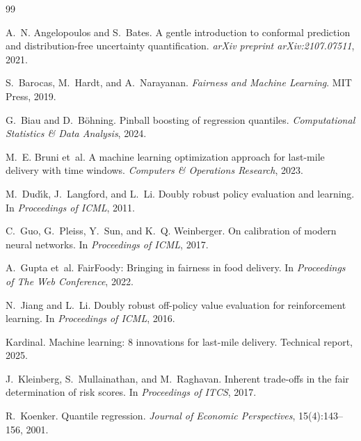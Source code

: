 \documentclass[10pt,twocolumn]{article}
\begin{document}

\begin{thebibliography}{99}

A.~N. Angelopoulos and S.~Bates.
\newblock A gentle introduction to conformal prediction and distribution-free uncertainty quantification.
\newblock \emph{arXiv preprint arXiv:2107.07511}, 2021.

S.~Barocas, M.~Hardt, and A.~Narayanan.
\newblock \emph{Fairness and Machine Learning}.
\newblock MIT Press, 2019.

G.~Biau and D.~B{\"o}hning.
\newblock Pinball boosting of regression quantiles.
\newblock \emph{Computational Statistics \& Data Analysis}, 2024.

M.~E. Bruni et~al.
\newblock A machine learning optimization approach for last-mile delivery with time windows.
\newblock \emph{Computers \& Operations Research}, 2023.

M.~Dud{\'\i}k, J.~Langford, and L.~Li.
\newblock Doubly robust policy evaluation and learning.
\newblock In \emph{Proceedings of ICML}, 2011.

C.~Guo, G.~Pleiss, Y.~Sun, and K.~Q. Weinberger.
\newblock On calibration of modern neural networks.
\newblock In \emph{Proceedings of ICML}, 2017.

A.~Gupta et~al.
\newblock FairFoody: Bringing in fairness in food delivery.
\newblock In \emph{Proceedings of The Web Conference}, 2022.

N.~Jiang and L.~Li.
\newblock Doubly robust off-policy value evaluation for reinforcement learning.
\newblock In \emph{Proceedings of ICML}, 2016.

Kardinal.
\newblock Machine learning: 8 innovations for last-mile delivery.
\newblock Technical report, 2025.

J.~Kleinberg, S.~Mullainathan, and M.~Raghavan.
\newblock Inherent trade-offs in the fair determination of risk scores.
\newblock In \emph{Proceedings of ITCS}, 2017.

R.~Koenker.
\newblock Quantile regression.
\newblock \emph{Journal of Economic Perspectives}, 15(4):143--156, 2001.


\end{thebibliography}
\end{document}
